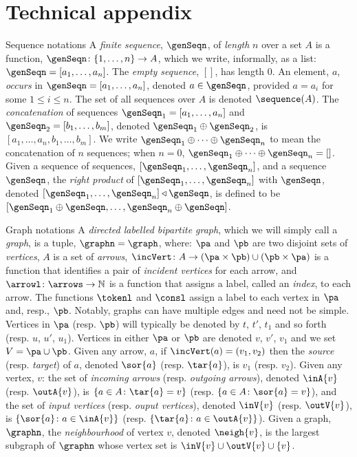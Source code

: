 \documentclass[a4paper]{article}
\theoremstyle{definition}
\begin{document}
	\section{Technical appendix} \label{appendix}
	\begin{paragraph}{Sequence notations}
		A \textit{finite sequence}, $\genSeqn$, of \textit{length} $n$ over a set $A$ is a function, $\genSeqn\colon \{1,\ldots,n\}\to A$, which we write, informally, as a list: $\genSeqn=[a_1,\ldots,a_n]$. The \textit{empty sequence}, $[]$, has length 0. An element, $a$, \textit{occurs} in $\genSeqn=[a_1,\ldots,a_n]$, denoted $a\in \genSeqn$,  provided $a=a_i$ for some $1\leq i \leq n$. The set of all sequences over $A$ is denoted $\sequence(A)$. The \textit{concatenation} of sequences $\genSeqn_1=[a_1,\ldots,a_n]$ and $\genSeqn_2=[b_1,\ldots,b_m]$, denoted $\genSeqn_1\oplus \genSeqn_2$, is $[a_1,\ldots,a_n,b_1,\ldots,b_m]$. We write $\genSeqn_1\oplus \cdots\oplus \genSeqn_n$ to mean the concatenation of $n$ sequences; when $n=0$, $\genSeqn_1\oplus \cdots\oplus \genSeqn_n=[]$. Given a sequence of sequences, $[\genSeqn_1,\ldots,\genSeqn_n]$, and a sequence $\genSeqn$, the \textit{right product} of $[\genSeqn_1,\ldots,\genSeqn_n]$ with $\genSeqn$,  denoted $[\genSeqn_1,\ldots,\genSeqn_n]\triangleleft \genSeqn$, is defined to be $[\genSeqn_1\oplus \genSeqn,\ldots,\genSeqn_n\oplus \genSeqn]$.
	\end{paragraph}
	
	
	\begin{paragraph}{Graph notations}
		A \textit{directed labelled bipartite graph}, which we will simply call a \textit{graph}, is a tuple, $\graphn=\graph$, where: $\pa$ and $\pb$ are two disjoint sets of \textit{vertices}, $A$ is a set of \textit{arrows}, $\incVert\colon A \to (\pa\times \pb) \cup (\pb \times \pa)$ is a function that identifies a pair of \textit{incident vertices} for each arrow, and $\arrowl\colon \arrows \to \mathbb{N}$ is a function that assigns a label, called an \textit{index}, to each arrow. The functions $\tokenl$ and $\consl$ assign a label to each vertex in $\pa$ and, resp., $\pb$. Notably, graphs can have multiple edges and need not be simple. Vertices in $\pa$ (resp. $\pb$) will typically be denoted by $t$, $t'$, $t_1$ and so forth (resp. $u$, $u'$, $u_1$). Vertices in either $\pa$ or $\pb$ are denoted $v$, $v'$, $v_1$ and we set $V=\pa\cup \pb$.  Given any arrow, $a$, if $\incVert(a)=(v_1,v_2)$ then the \textit{source} (resp. \textit{target}) of $a$, denoted $\sor{a}$ (resp. $\tar{a}$), is $v_1$ (resp. $v_2$). Given any vertex, $v$: the set of \textit{incoming arrows} (resp. \textit{outgoing arrows}), denoted $\inA{v}$ (resp. $\outA{v}$), is $\{a\in A \colon  \tar{a} =v\}$ (resp. $\{a\in A \colon \sor{a} =v\}$), and the set of \textit{input vertices} (resp. \textit{ouput vertices}), denoted $\inV{v}$ (resp. $\outV{v}$),  is $\{\sor{a}\colon a\in \inA{v}\}$ (resp. $\{\tar{a}\colon a\in \outA{v}\}$). Given a graph, $\graphn$, the \textit{neighbourhood} of vertex $v$, denoted  $\neigh{v}$, is the largest subgraph of $\graphn$ whose vertex set is $\inV{v}\cup \outV{v}\cup \{v\}$.
	\end{paragraph}
	
\end{document}
